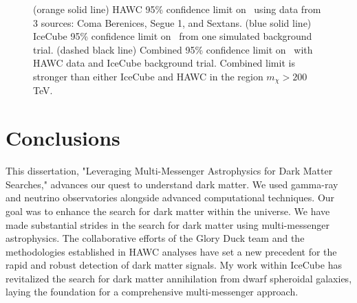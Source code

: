 \begin{figure}
    \caption{(orange solid line) HAWC 95\% confidence limit on \sv~using data from 3 sources: Coma Berenices, Segue 1, and Sextans. (blue solid line) IceCube 95\% confidence limit on \sv~from one simulated background trial. (dashed black line) Combined 95\% confidence limit on \sv~with HAWC data and IceCube background trial. Combined limit is stronger than either IceCube and HAWC in the region $m_\chi > 200$ TeV. }
    \label{fig:nuDuck_mockdata}
\end{figure}

\section{Conclusions}\label{sec:conclusions}

This dissertation, "Leveraging Multi-Messenger Astrophysics for Dark Matter Searches," advances our quest to understand dark matter.
We used gamma-ray and neutrino observatories alongside advanced computational techniques.
Our goal was to enhance the search for dark matter within the universe.
We have made substantial strides in the search for dark matter using multi-messenger astrophysics.
The collaborative efforts of the Glory Duck team and the methodologies established in HAWC analyses have set a new precedent for the rapid and robust detection of dark matter signals.
My work within IceCube has revitalized the search for dark matter annihilation from dwarf spheroidal galaxies, laying the foundation for a comprehensive multi-messenger approach.

